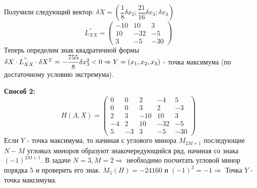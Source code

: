 \documentclass[12pt]{article}
\begin{document}
\begin{enumerate}
\begin{equation}
\end{equation}
Получили следующий вектор: $\delta X=(\dfrac{1}{8}\delta x_3;\dfrac{21}{16}\delta x_3;\delta x_3)$
\begin{equation}
  L_{XX}^{''}=\begin{pmatrix}
    -10&10&3\\10&-32&-5\\3&-5&-30
  \end{pmatrix}
\end{equation}
Теперь определим знак квадратичной формы $\delta X \cdot L_{XX}^{''} \cdot \delta X^T=-\dfrac{755}{8}\delta x_3^2<0\\
\Rightarrow Y=(x_1,x_2,x_3)$ - точка максимума (по достаточному условию экстремума).
\end{enumerate}
\textbf{Способ 2:}
\begin{equation}
  H(\Lambda, X)=\begin{pmatrix}
    0&0&2&-4&5\\0&0&3&2&-3\\2&3&-10&10&3\\-4&2&10&-32&-5\\5&-3&3&-5&-30
  \end{pmatrix}
\end{equation}
Если $Y$ - точка максимума, то начиная с углового минора $M_{2M+1}$ последующие $N-M$ угловых миноров образуют знакочередующийся ряд, начиная со знака $(-1)^{2M+1}$.
В задаче $N=3,M=2\Rightarrow$ необходимо посчитать угловой минор порядка 5 и проверить его знак. $M_5(H)=-24160$ и $(-1)^3=-1\Rightarrow$
Точка $Y$ - точка максимума.
\end{document}
